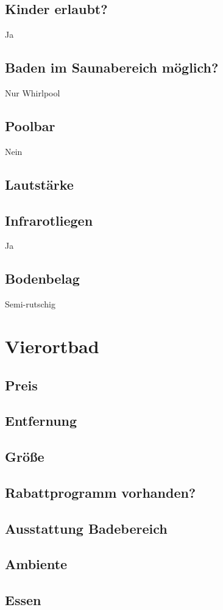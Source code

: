\documentclass{article}
\begin{document}
\subsection*{Kinder erlaubt?} Ja
\subsection*{Baden im Saunabereich möglich?} Nur Whirlpool
\subsection*{Poolbar} Nein
\subsection*{Lautstärke}
\subsection*{Infrarotliegen} Ja
\subsection*{Bodenbelag} Semi-rutschig
\pagebreak

\section*{Vierortbad}
\subsection*{Preis}
\subsection*{Entfernung}
\subsection*{Größe}
\subsection*{Rabattprogramm vorhanden?}
\subsection*{Ausstattung Badebereich}
\subsection*{Ambiente}
\subsection*{Essen}
\end{document}
